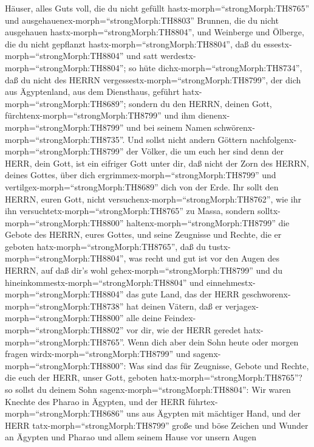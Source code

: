 Häuser, alles Guts voll, die du nicht gefüllt
hastx-morph=``strongMorph:TH8765'' und
ausgehauenex-morph=``strongMorph:TH8803'' Brunnen, die du nicht
ausgehauen hastx-morph=``strongMorph:TH8804'', und Weinberge und
Ölberge, die du nicht gepflanzt hastx-morph=``strongMorph:TH8804'', daß
du essestx-morph=``strongMorph:TH8804'' und satt
werdestx-morph=``strongMorph:TH8804'';  so hüte
dichx-morph=``strongMorph:TH8734'', daß du nicht des HERRN
vergessestx-morph=``strongMorph:TH8799'', der dich aus Ägyptenland, aus
dem Diensthaus, geführt hatx-morph=``strongMorph:TH8689''; 
sondern du den HERRN, deinen Gott,
fürchtenx-morph=``strongMorph:TH8799'' und ihm
dienenx-morph=``strongMorph:TH8799'' und bei seinem Namen
schwörenx-morph=``strongMorph:TH8735''.  Und sollst nicht
andern Göttern nachfolgenx-morph=``strongMorph:TH8799'' der Völker, die
um euch her sind  denn der HERR, dein Gott, ist ein
eifriger Gott unter dir, daß nicht der Zorn des HERRN, deines Gottes,
über dich ergrimmex-morph=``strongMorph:TH8799'' und
vertilgex-morph=``strongMorph:TH8689'' dich von der Erde. 
Ihr sollt den HERRN, euren Gott, nicht
versuchenx-morph=``strongMorph:TH8762'', wie ihr ihn
versuchtetx-morph=``strongMorph:TH8765'' zu Massa,  sondern
solltx-morph=``strongMorph:TH8800'' haltenx-morph=``strongMorph:TH8799''
die Gebote des HERRN, eures Gottes, und seine Zeugnisse und Rechte, die
er geboten hatx-morph=``strongMorph:TH8765'',  daß du
tustx-morph=``strongMorph:TH8804'', was recht und gut ist vor den Augen
des HERRN, auf daß dir's wohl gehex-morph=``strongMorph:TH8799'' und du
hineinkommestx-morph=``strongMorph:TH8804'' und
einnehmestx-morph=``strongMorph:TH8804'' das gute Land, das der HERR
geschworenx-morph=``strongMorph:TH8738'' hat deinen Vätern,
 daß er verjagex-morph=``strongMorph:TH8800'' alle deine
Feindex-morph=``strongMorph:TH8802'' vor dir, wie der HERR geredet
hatx-morph=``strongMorph:TH8765''.  Wenn dich aber dein
Sohn heute oder morgen fragen wirdx-morph=``strongMorph:TH8799'' und
sagenx-morph=``strongMorph:TH8800'': Was sind das für Zeugnisse, Gebote
und Rechte, die euch der HERR, unser Gott, geboten
hatx-morph=``strongMorph:TH8765''?  so sollst du deinem
Sohn sagenx-morph=``strongMorph:TH8804'': Wir waren Knechte des Pharao
in Ägypten, und der HERR führtex-morph=``strongMorph:TH8686'' uns aus
Ägypten mit mächtiger Hand,  und der HERR
tatx-morph=``strongMorph:TH8799'' große und böse Zeichen und Wunder an
Ägypten und Pharao und allem seinem Hause vor unsern Augen 

